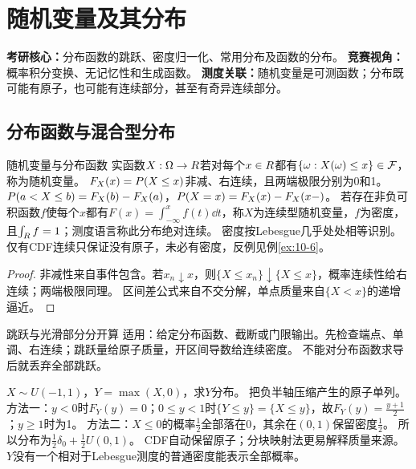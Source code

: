 \chapter{随机变量及其分布}\label{ch:02}
\begin{examtip}
\textbf{考研核心：}分布函数的跳跃、密度归一化、常用分布及函数的分布。
\textbf{竞赛视角：}概率积分变换、无记忆性和生成函数。
\textbf{测度关联：}随机变量是可测函数；分布既可能有原子，也可能有连续部分，甚至有奇异连续部分。
\end{examtip}
\section{分布函数与混合型分布}\label{sec:21}
\begin{definition}{随机变量与分布函数}
实函数$X:\Omega\to R$若对每个$x\in R$都有$\{\omega:X(\omega)\le x\}\in\mathcal F$，称为随机变量。
$F_X(x)=P(X\le x)$非减、右连续，且两端极限分别为0和1。
$P(a<X\le b)=F_X(b)-F_X(a)$，$P(X=x)=F_X(x)-F_X(x-)$。
若存在非负可积函数$f$使每个$x$都有$F(x)=\int_{-\infty}^xf(t)\dd t$，称$X$为连续型随机变量，$f$为密度，且$\int_R f=1$；测度语言称此分布绝对连续。
密度按Lebesgue几乎处处相等识别。仅有CDF连续只保证没有原子，未必有密度，反例见例\ref{ex:10-6}。
\end{definition}
\begin{proof}
非减性来自事件包含。若$x_n\downarrow x$，则$\{X\le x_n\}\downarrow\{X\le x\}$，概率连续性给右连续；两端极限同理。
区间差公式来自不交分解，单点质量来自$\{X<x\}$的递增逼近。
\end{proof}
\begin{method}{跳跃与光滑部分分开算}
适用：给定分布函数、截断或门限输出。先检查端点、单调、右连续；跳跃量给原子质量，开区间导数给连续密度。
不能对分布函数求导后就丢弃全部跳跃。
\end{method}
{$X\sim U(-1,1)$，$Y=\max(X,0)$，求$Y$分布。}
{把负半轴压缩产生的原子单列。}
{方法一：$y<0$时$F_Y(y)=0$；$0\le y<1$时$\{Y\le y\}=\{X\le y\}$，故$F_Y(y)=\frac{y+1}{2}$；$y\ge1$时为1。
方法二：$X\le0$的概率$\frac{1}{2}$全部落在0，其余在$(0,1)$保留密度$\frac{1}{2}$。
所以分布为$\frac12\delta_0+\frac12U(0,1)$。}
{CDF自动保留原子；分块映射法更易解释质量来源。}
{$Y$没有一个相对于Lebesgue测度的普通密度能表示全部概率。}
